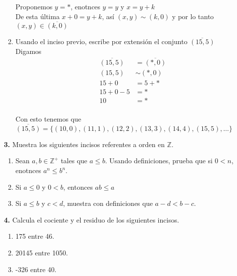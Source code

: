 \documentclass[12pt]{article}
\begin{document}
\begin{enumerate}[label=\alph*)]
    Proponemos $y = \ast$, enotnces $y = y$ y $x = y + k$\\

    De esta última $x + 0 = y + k$, así $(x, y) \sim (k, 0)$ y por lo tanto $(x, y) \in \overline{(k, 0)}$\\

    \item Usando el inciso previo, escribe por extensión el conjunto $\overline{(15, 5)}$\\

    Digamos 
    \begin{align*}
        \overline{(15, 5)} &= \overline{(\ast, 0)}\\
        (15, 5) &\sim (\ast, 0)\\
        15 + 0 &= 5 + \ast\\
        15 + 0 - 5 &= \ast\\
        10 &= \ast\\
    \end{align*}

    Con esto tenemos que $\overline{(15, 5)} = \{(10, 0), (11, 1), (12, 2), (13, 3), (14, 4), (15, 5), \dots\}$\\
\end{enumerate}
\vspace{1cm}

%
%
\textbf{3.} Muestra los siguientes incisos referentes a orden en $\mathbb{Z}$.
    \begin{enumerate}[label=\alph*)]
        \item Sean $a, b \in \mathbb{Z}^+$ tales que $a \leq b$. Usando definiciones, prueba que si $0 < n$, enotnces $a^n \leq b^n$. 

        \item Si $ a \leq 0$ y $0 < b$, entonces $ab \leq a$

        \item Si $a \leq b$ y $c < d$, muestra con definiciones que $a - d < b - c$.

    \end{enumerate}
\vspace{1cm}

%
%
\textbf{4.} Calcula el cociente y el residuo de los siguientes incisos.

    \begin{enumerate}[label=\alph*)]

        \item 175 entre 46.

        \item 20145 entre 1050.

        \item -326 entre 40.

    \end{enumerate}
\vspace{1cm}
\end{document}
